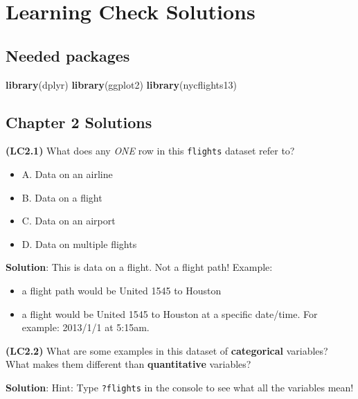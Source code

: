 \documentclass[12pt,]{krantz}
\makeatletter
\newenvironment{Shaded}{\begin{snugshade}}{\end{snugshade}}
\newcommand{\KeywordTok}[1]{\textcolor[rgb]{0.27,0.27,0.27}{\textbf{#1}}}
\newcommand{\NormalTok}[1]{#1}
\providecommand{\tightlist}{%
  \setlength{\itemsep}{0pt}\setlength{\parskip}{0pt}}
\newenvironment{kframe}{%
\medskip{}
\setlength{\fboxsep}{.8em}
 \def\at@end@of@kframe{}%
 \ifinner\ifhmode%
  \def\at@end@of@kframe{\end{minipage}}%
  \begin{minipage}{\columnwidth}%
 \fi\fi%
 \def\FrameCommand##1{\hskip\@totalleftmargin \hskip-\fboxsep
 \colorbox{shadecolor}{##1}\hskip-\fboxsep
     \hskip-\linewidth \hskip-\@totalleftmargin \hskip\columnwidth}%
 \MakeFramed {\advance\hsize-\width
   \@totalleftmargin\z@ \linewidth\hsize
   \@setminipage}}%
 {\par\unskip\endMakeFramed%
 \at@end@of@kframe}
\renewenvironment{Shaded}{\begin{kframe}}{\end{kframe}}
\theoremstyle{definition}
\theoremstyle{definition}
\theoremstyle{definition}
\theoremstyle{remark}
\makeatother
\begin{document}
\chapter{Learning Check Solutions}\label{appendixD}

\section{Needed packages}\label{needed-packages-12}

\begin{Shaded}
\begin{Highlighting}[]
\KeywordTok{library}\NormalTok{(dplyr)}
\KeywordTok{library}\NormalTok{(ggplot2)}
\KeywordTok{library}\NormalTok{(nycflights13)}
\end{Highlighting}
\end{Shaded}

\section{Chapter 2 Solutions}\label{chapter-2-solutions}

\textbf{(LC2.1)} What does any \emph{ONE} row in this \texttt{flights}
dataset refer to?

\begin{itemize}
\tightlist
\item
  A. Data on an airline
\item
  B. Data on a flight
\item
  C. Data on an airport
\item
  D. Data on multiple flights
\end{itemize}

\textbf{Solution}: This is data on a flight. Not a flight path! Example:

\begin{itemize}
\tightlist
\item
  a flight path would be United 1545 to Houston
\item
  a flight would be United 1545 to Houston at a specific date/time. For
  example: 2013/1/1 at 5:15am.
\end{itemize}

\textbf{(LC2.2)} What are some examples in this dataset of
\textbf{categorical} variables? What makes them different than
\textbf{quantitative} variables?

\textbf{Solution}: Hint: Type \texttt{?flights} in the console to see
what all the variables mean!
\end{document}
